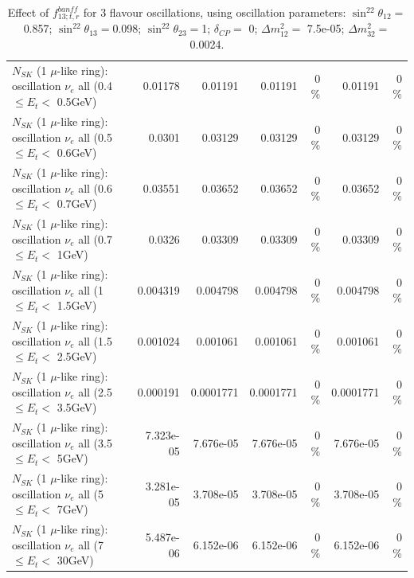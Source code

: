 \begin{table}
\begin{tabular}{| l | r | r | r  r | r  r |}
$N_{SK}$ (1 $\mu$-like ring): oscillation $\nu_{e}$ all (0.4 $\leq E_{t} <$ 0.5GeV) &         0.01178 &         0.01191 &         0.01191 &        0 \%  &         0.01191 &        0 \%  \\ 
$N_{SK}$ (1 $\mu$-like ring): oscillation $\nu_{e}$ all (0.5 $\leq E_{t} <$ 0.6GeV) &          0.0301 &         0.03129 &         0.03129 &        0 \%  &         0.03129 &        0 \%  \\ 
$N_{SK}$ (1 $\mu$-like ring): oscillation $\nu_{e}$ all (0.6 $\leq E_{t} <$ 0.7GeV) &         0.03551 &         0.03652 &         0.03652 &        0 \%  &         0.03652 &        0 \%  \\ 
$N_{SK}$ (1 $\mu$-like ring): oscillation $\nu_{e}$ all (0.7 $\leq E_{t} <$ 1GeV) &          0.0326 &         0.03309 &         0.03309 &        0 \%  &         0.03309 &        0 \%  \\ 
$N_{SK}$ (1 $\mu$-like ring): oscillation $\nu_{e}$ all (1 $\leq E_{t} <$ 1.5GeV) &        0.004319 &        0.004798 &        0.004798 &        0 \%  &        0.004798 &        0 \%  \\ 
$N_{SK}$ (1 $\mu$-like ring): oscillation $\nu_{e}$ all (1.5 $\leq E_{t} <$ 2.5GeV) &        0.001024 &        0.001061 &        0.001061 &        0 \%  &        0.001061 &        0 \%  \\ 
$N_{SK}$ (1 $\mu$-like ring): oscillation $\nu_{e}$ all (2.5 $\leq E_{t} <$ 3.5GeV) &        0.000191 &       0.0001771 &       0.0001771 &        0 \%  &       0.0001771 &        0 \%  \\ 
$N_{SK}$ (1 $\mu$-like ring): oscillation $\nu_{e}$ all (3.5 $\leq E_{t} <$ 5GeV) &       7.323e-05 &       7.676e-05 &       7.676e-05 &        0 \%  &       7.676e-05 &        0 \%  \\ 
 $N_{SK}$ (1 $\mu$-like ring): oscillation $\nu_{e}$ all (5 $\leq E_{t} <$ 7GeV) &       3.281e-05 &       3.708e-05 &       3.708e-05 &        0 \%  &       3.708e-05 &        0 \%  \\ 
$N_{SK}$ (1 $\mu$-like ring): oscillation $\nu_{e}$ all (7 $\leq E_{t} <$ 30GeV) &       5.487e-06 &       6.152e-06 &       6.152e-06 &        0 \%  &       6.152e-06 &        0 \%  \\ 
\hline
\hline
\end{tabular}
\caption{ Effect of $f_{13; t, r}^{banff}$ for 3 flavour oscillations, using oscillation parameters:  $\sin^22\theta_{12} = $0.857; $\sin^22\theta_{13} = $0.098; $\sin^22\theta_{23} = $1; $\delta_{CP} = $        0; $\Delta m^2_{12} = $    7.5e-05; $\Delta m^2_{32} = $    0.0024. }
\label{tab:num_banff_13_1RmuT_3f_osc_t13:0.098}
\end{table}

